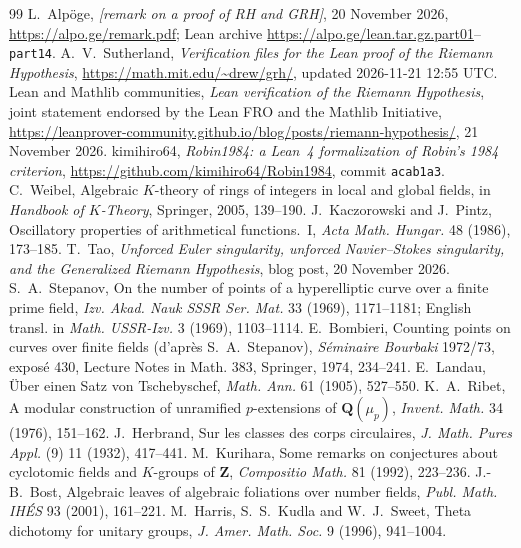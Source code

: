 \documentclass[11pt]{article}
\newcommand{\Lean}[1]{\texttt{\small #1}}
\newcommand{\Q}{\mathbf{Q}}
\newcommand{\Z}{\mathbf{Z}}
\begin{document}
\begin{thebibliography}{99}\footnotesize\setlength{\itemsep}{0pt}
 L.~Alp\"oge, \emph{[remark on a proof of RH and GRH]}, 20 November 2026, \url{https://alpo.ge/remark.pdf}; Lean archive \url{https://alpo.ge/lean.tar.gz.part01}--\Lean{part14}.
 A.~V.~Sutherland, \emph{Verification files for the Lean proof of the Riemann Hypothesis}, \url{https://math.mit.edu/~drew/grh/}, updated 2026-11-21 12:55 UTC.
 Lean and Mathlib communities, \emph{Lean verification of the Riemann Hypothesis}, joint statement endorsed by the Lean FRO and the Mathlib Initiative, \url{https://leanprover-community.github.io/blog/posts/riemann-hypothesis/}, 21 November 2026.
 kimihiro64, \emph{Robin1984: a Lean~4 formalization of Robin's 1984 criterion}, \url{https://github.com/kimihiro64/Robin1984}, commit \Lean{acab1a3}.
 C.~Weibel, Algebraic $K$-theory of rings of integers in local and global fields, in \emph{Handbook of $K$-Theory}, Springer, 2005, 139--190.
 J.~Kaczorowski and J.~Pintz, Oscillatory properties of arithmetical functions.~I, \emph{Acta Math. Hungar.} 48 (1986), 173--185.
 T.~Tao, \emph{Unforced Euler singularity, unforced Navier--Stokes singularity, and the Generalized Riemann Hypothesis}, blog post, 20 November 2026.
 S.~A.~Stepanov, On the number of points of a hyperelliptic curve over a finite prime field, \emph{Izv. Akad. Nauk SSSR Ser. Mat.} 33 (1969), 1171--1181; English transl. in \emph{Math. USSR-Izv.} 3 (1969), 1103--1114.
 E.~Bombieri, Counting points on curves over finite fields (d'apr\`es S.~A.~Stepanov), \emph{S\'eminaire Bourbaki} 1972/73, expos\'e 430, Lecture Notes in Math. 383, Springer, 1974, 234--241.
 E.~Landau, \"Uber einen Satz von Tschebyschef, \emph{Math. Ann.} 61 (1905), 527--550.
 K.~A.~Ribet, A modular construction of unramified $p$-extensions of $\Q(\mu_p)$, \emph{Invent. Math.} 34 (1976), 151--162.
 J.~Herbrand, Sur les classes des corps circulaires, \emph{J. Math. Pures Appl.} (9) 11 (1932), 417--441.
 M.~Kurihara, Some remarks on conjectures about cyclotomic fields and $K$-groups of $\Z$, \emph{Compositio Math.} 81 (1992), 223--236.
 J.-B.~Bost, Algebraic leaves of algebraic foliations over number fields, \emph{Publ. Math. IH\'ES} 93 (2001), 161--221.
 M.~Harris, S.~S.~Kudla and W.~J.~Sweet, Theta dichotomy for unitary groups, \emph{J. Amer. Math. Soc.} 9 (1996), 941--1004.

\end{thebibliography}
\end{document}
